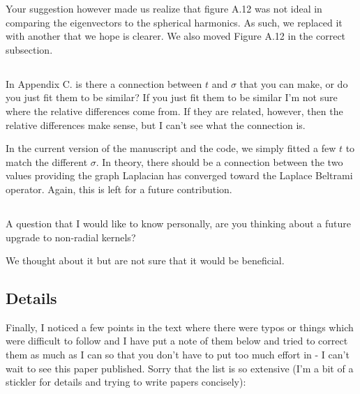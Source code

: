 \documentclass[12pt,a4paper]{article}
\newcommand{\1}{\b{1}}              %
\newcommand{\0}{\b{0}}              %
\begin{document}
Your suggestion however made us realize that figure A.12 was not ideal in comparing the eigenvectors to the spherical harmonics.
As such, we replaced it with another that we hope is clearer.
We also moved Figure A.12 in the correct subsection.

\subsection{}
\begin{mdframed}[style=comment]
In Appendix C. is there a connection between $t$ and $\sigma$ that you can make, or do you just fit them to be similar? If you just fit them to be similar I'm not sure where the relative differences come from. If they are related, however, then the relative differences make sense, but I can't see what the connection is.
\end{mdframed}

In the current version of the manuscript and the code, we simply fitted a few $t$ to match the different $\sigma$.
In theory, there should be a connection between the two values providing the graph Laplacian has converged toward the Laplace Beltrami operator.
Again, this is left for a future contribution.

\subsection{}
\begin{mdframed}[style=comment]
A question that I would like to know personally, are you thinking about a future upgrade to non-radial kernels?
\end{mdframed}
We thought about it but are not sure that it would be beneficial.


\subsection{Details}
\begin{mdframed}[style=comment]
Finally, I noticed a few points in the text where there were typos or things which were difficult to follow and I have put a note of them below and tried to correct them as much as I can so that you don't have to put too much effort in - I can't wait to see this paper published. Sorry that the list is so extensive (I'm a bit of a stickler for details and trying to write papers concisely):
\end{mdframed}
\end{document}
